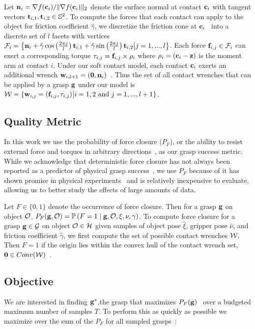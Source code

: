 Let $\mathbf{n}_i = \nabla f(\mathbf{c}_i) / \| \nabla f(\mathbf{c}_i) \|_2$ denote the surface normal at contact $\mathbf{c}_i$ with tangent vectors $\mathbf{t}_{i,1}, \mathbf{t}_{i,2} \in \mathbb{S}^2$.
To compute the forces that each contact can apply to the object for friction coefficient $\hat{\gamma}$, we discretize the friction cone at $\mathbf{c}_i$~\cite{pokorny2013classical} into a discrete set of $l$ facets with vertices $\mathcal{F}_{i} = \left\{ \mathbf{n}_i + \hat{\gamma} \cos \left( \frac{2 \pi j}{l} \right) \mathbf{t}_{i,1} + \hat{\gamma} \sin \left( \frac{2 \pi j}{l} \right) \mathbf{t}_{i,2} \big| j = 1, ..., l \right\}$.
Each force $\mathbf{f}_{i,j} \in \mathcal{F}_{i}$ can exert a corresponding torque $\tau_{i,j} = \mathbf{f}_{i,j} \times \rho_i$ where $\rho_i = (\mathbf{c}_i - \mathbf{z})$ is the moment arm at contact $i$.
Under our soft contact model, each contact $\mathbf{c}_i$ exerts an additional wrench $\mathbf{w}_{i,l+1} = (\mathbf{0}, \mathbf{n}_i)$~\cite{zheng2005}.
Thus the set of all contact wrenches that can be applied by a grasp $\mathbf{g}$ under our model is $\mathcal{W} = \{ \mathbf{w}_{i,j} = (\mathbf{f}_{i,j}, \tau_{i,j}) \big| i = 1, 2 \text{ and } j = 1, ..., l+1\}$.

\subsection{Quality Metric}
In this work we use the probability of force closure ($P_F$), or the ability to resist external force and torques in arbitrary directions~\cite{ferrari1992}, as our grasp success metric.
While we acknowledge that deterministic force closure has not always been reported as a predictor of physical grasp success~\cite{balasubramanian2012physical, diankov2010automated}, we use $P_F$ because of it has shown promise in physical experiments~\cite{kim2012physically, weisz2012pose} and is relatively inexpensive to evaluate, allowing us to better study the effects of large amounts of data.

Let $F \in \{0, 1\}$ denote the occurrence of force closure.
Then for a grasp $\mathbf{g}$ on object $\mathcal{O}$, $P_F(\mathbf{g}, \mathcal{O}) = \mathbb{P}\left(F = 1 \mid \mathbf{g}, \mathcal{O}, \xi, \nu, \gamma \right)$.
To compute force closure for a grasp $\mathbf{g} \in \mathcal{G}$ on object $\mathcal{O} \in \mathcal{H}$ given samples of object pose $\hat{\xi}$, gripper pose $\hat{\nu}$, and friction coefficient $\hat{\gamma}$, we first compute the set of possible contact wrenches $\mathcal{W}$.
Then $F = 1$ if the origin lies within the convex hull of the contact wrench set, $\mathbf{0} \in Conv(\mathcal{W})$~\cite{weisz2012pose}.

\subsection{Objective}
We are interested in finding $\mathbf{g}^*$,the grasp that maximizes $P_F(\mathbf{g})$~\cite{kim2012physically, laskey2015bandits, mahler2015gp, weisz2012pose} over a budgeted maximum number of samples $T$.
To perform this as quickly as possible we maximize over the sum of the $P_F$ for all sampled grasps~\cite{laskey2015bandits, srinivas10gaussian}:

